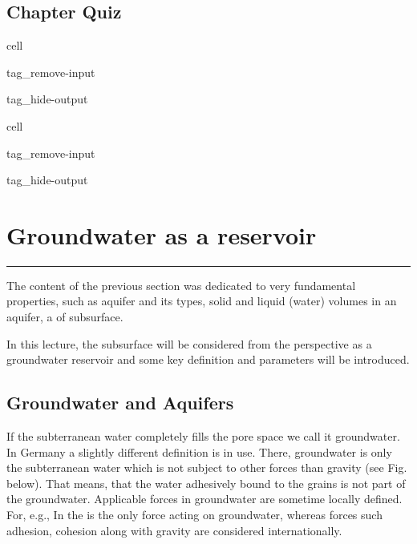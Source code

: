\documentclass[letterpaper,10pt,english]{jupyterBook}
\begin{document}
\section{Chapter Quiz}
\label{\detokenize{content/flow/12_subsurface_structure:chapter-quiz}}
\begin{sphinxuseclass}{cell}
\begin{sphinxuseclass}{tag_remove-input}
\begin{sphinxuseclass}{tag_hide-output}
\end{sphinxuseclass}
\end{sphinxuseclass}
\end{sphinxuseclass}
\sphinxstepscope

\begin{sphinxuseclass}{cell}
\begin{sphinxuseclass}{tag_remove-input}
\begin{sphinxuseclass}{tag_hide-output}
\end{sphinxuseclass}
\end{sphinxuseclass}
\end{sphinxuseclass}

\chapter{Groundwater as a reservoir}
\label{\detokenize{content/flow/L3/13_gw_storage:groundwater-as-a-reservoir}}\label{\detokenize{content/flow/L3/13_gw_storage::doc}}
\sphinxAtStartPar
{}


\bigskip\hrule\bigskip


\sphinxAtStartPar
The content of the previous section was dedicated to very fundamental properties, such as aquifer and its types, solid and liquid (water) volumes in an aquifer, a of subsurface.

\sphinxAtStartPar
In this lecture, the subsurface will be considered from the perspective as a groundwater reservoir and some key definition and parameters will be introduced.


\section{Groundwater and Aquifers}
\label{\detokenize{content/flow/L3/13_gw_storage:groundwater-and-aquifers}}
\sphinxAtStartPar
If the subterranean water completely fills the pore space we call it groundwater. In Germany a slightly different definition is in use. There, groundwater is only the subterranean water which is not subject to other forces than gravity (see Fig. below). That means, that the water adhesively bound to the grains is not part of the groundwater. Applicable forces in groundwater are sometime locally defined. For, e.g., In  the  is the only force acting on groundwater, whereas forces such adhesion, cohesion along with gravity are considered internationally.
\end{document}
